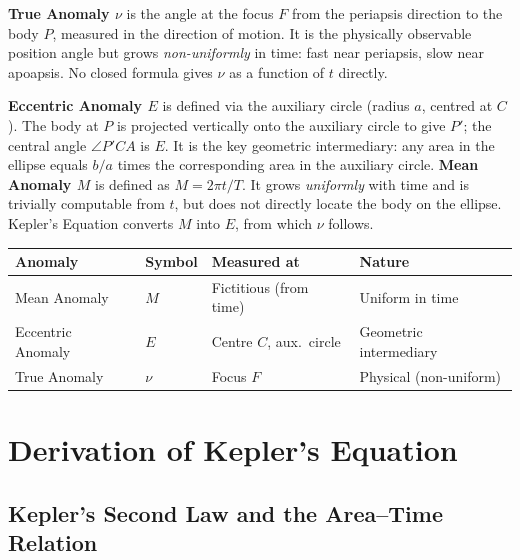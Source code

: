 \documentclass[12pt]{article}
\begin{document}
\vspace{0.4cm}

\noindent
\textbf{True Anomaly $\nu$} is the angle at the focus $F$ from the periapsis direction
to the body $P$, measured in the direction of motion. It is the physically observable
position angle but grows \emph{non-uniformly} in time: fast near periapsis, slow near
apoapsis. No closed formula gives $\nu$ as a function of $t$ directly.

\bigskip\noindent
\textbf{Eccentric Anomaly $E$} is defined via the auxiliary circle (radius $a$,
centred at $C$). The body at $P$ is projected vertically onto the auxiliary circle
to give $P'$; the central angle $\angle P'CA$ is $E$. It is the key geometric
intermediary: any area in the ellipse equals $b/a$ times the corresponding area in
the auxiliary circle.
\newpage
\bigskip\noindent
\textbf{Mean Anomaly $M$} is defined as $M = 2\pi t/T$. It grows \emph{uniformly}
with time and is trivially computable from $t$, but does not directly locate the body
on the ellipse. Kepler's Equation converts $M$ into $E$, from which $\nu$ follows.

\vspace{0.5cm}
\begin{center}
\renewcommand{\arraystretch}{1.5}
\begin{tabular}{llll}
  \toprule
  \textbf{Anomaly} & \textbf{Symbol} & \textbf{Measured at} & \textbf{Nature} \\
  \midrule
  Mean Anomaly      & $M$ & Fictitious (from time)   & Uniform in time \\
  Eccentric Anomaly & $E$ & Centre $C$, aux.\ circle & Geometric intermediary \\
  True Anomaly      & $\nu$ & Focus $F$              & Physical (non-uniform) \\
  \bottomrule
\end{tabular}
\end{center}
\vspace{0.5cm}
\section{Derivation of Kepler's Equation}

\subsection{Kepler's Second Law and the Area--Time Relation}
\end{document}
